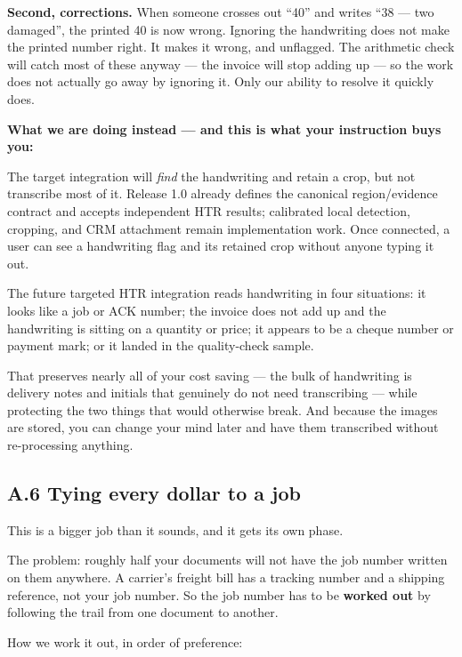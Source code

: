 \documentclass[
]{article}
\begin{document}
\textbf{Second, corrections.} When someone crosses out ``40'' and writes
``38 --- two damaged'', the printed 40 is now wrong. Ignoring the
handwriting does not make the printed number right. It makes it wrong,
and unflagged. The arithmetic check will catch most of these anyway ---
the invoice will stop adding up --- so the work does not actually go
away by ignoring it. Only our ability to resolve it quickly does.

\textbf{What we are doing instead --- and this is what your instruction
buys you:}

The target integration will \emph{find} the handwriting and retain a
crop, but not transcribe most of it. Release 1.0 already defines the
canonical region/evidence contract and accepts independent HTR results;
calibrated local detection, cropping, and CRM attachment remain
implementation work. Once connected, a user can see a handwriting flag
and its retained crop without anyone typing it out.

The future targeted HTR integration reads handwriting in four
situations: it looks like a job or ACK number; the invoice does not add
up and the handwriting is sitting on a quantity or price; it appears to
be a cheque number or payment mark; or it landed in the quality-check
sample.

That preserves nearly all of your cost saving --- the bulk of
handwriting is delivery notes and initials that genuinely do not need
transcribing --- while protecting the two things that would otherwise
break. And because the images are stored, you can change your mind later
and have them transcribed without re-processing anything.

\subsection{A.6 Tying every dollar to a
job}\label{a.6-tying-every-dollar-to-a-job}

This is a bigger job than it sounds, and it gets its own phase.

The problem: roughly half your documents will not have the job number
written on them anywhere. A carrier's freight bill has a tracking number
and a shipping reference, not your job number. So the job number has to
be \textbf{worked out} by following the trail from one document to
another.

How we work it out, in order of preference:
\end{document}

